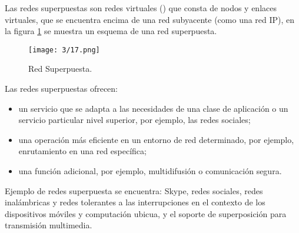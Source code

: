{ Las  \gls{redes superpuestas} son redes virtuales () que consta de nodos y enlaces virtuales, que se encuentra encima de una red subyacente (como una red IP), en la figura \ref{fig:red-overlay} se muestra un esquema de una red superpuesta.
 
 	\begin{figure}%
 	\texttt{[image: 3/17.png]}
 	\caption{Red Superpuesta.}
 	\label{fig:red-overlay}
 \end{figure}
 
 
  Las redes superpuestas ofrecen:   
 \begin{itemize}
 	\item   un servicio que se adapta a las necesidades de una clase de aplicación o un servicio particular  nivel superior, por ejemplo, las redes sociales;
 	\item  una operación más eficiente en un entorno de red determinado, por ejemplo, enrutamiento en una red específica;
 	\item  una función adicional, por ejemplo, multidifusión o comunicación segura.
 \end{itemize}    
 
 
 
 Ejemplo de redes superpuesta se encuentra: Skype,   redes sociales, redes inalámbricas  y redes tolerantes a las interrupciones en el contexto de los dispositivos móviles y
 computación ubicua,  y  el  soporte de superposición para transmisión multimedia.
 
}

